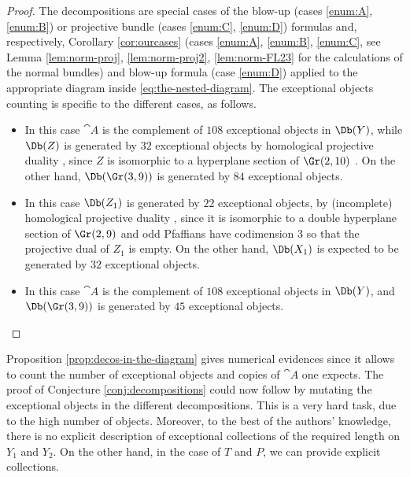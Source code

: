 \begin{proof}
The decompositions are special cases of the blow-up (cases \eqref{enum:A}, \eqref{enum:B}) or projective bundle (cases \eqref{enum:C}, \eqref{enum:D}) formulas and, respectively,
Corollary \ref{cor:ourcases} (cases \eqref{enum:A}, \eqref{enum:B}, \eqref{enum:C}, see Lemma \ref{lem:norm-proj}, \ref{lem:norm-proj2}, \ref{lem:norm-FL23} for the calculations
of the normal bundles) and blow-up formula (case \eqref{enum:D}) applied to the appropriate diagram inside
\eqref{eq:the-nested-diagram}.
The exceptional objects counting is specific to the different cases, as follows.

\begin{itemize}

\item[\eqref{enum:A}] In this case $\cat{A}$ is the complement of $108$ exceptional objects
in $\Db(Y)$, while $\Db(Z)$ is generated by $32$ exceptional objects by homological projective
duality \cite[Th.\,4.33]{rennemo-segal}, since $Z$ is isomorphic to a hyperplane
section of $\Gr(2,10)$ . On the other hand, $\Db(\Gr(3,9))$ is generated
by $84$ exceptional objects.

\item[\eqref{enum:B}] In this case $\Db(Z_1)$ is generated by $22$ exceptional objects,
by (incomplete) homological projective duality \cite[Th.\,4.33]{rennemo-segal},
since it is isomorphic to a double hyperplane
section of $\Gr(2,9)$ and odd Pfaffians have codimension
3 so that the projective dual of $Z_1$ is empty. On the other hand, $\Db(X_1)$ is
expected to be generated by $32$ exceptional objects.

\item[\eqref{enum:C}] In this case $\cat{A}$ is the complement of $108$ exceptional objects
in $\Db(Y)$, and $\Db(\Gr(3,9))$ is generated
by $45$ exceptional objects.\qedhere
\end{itemize}
\end{proof}

Proposition \ref{prop:decos-in-the-diagram} gives numerical evidences since it allows to count the
number of exceptional objects and copies of $\cat{A}$ one expects. The proof of Conjecture
\ref{conj:decompositions} could now follow by mutating the exceptional objects in the different decompositions.
This is a very hard task, due to the high number of objects. Moreover, to the best of
the authors' knowledge,
there is no explicit description of exceptional collections of the required length on $Y_1$ and $Y_2$.
On the other hand, in the case of $T$ and $P$, we can provide explicit collections.

